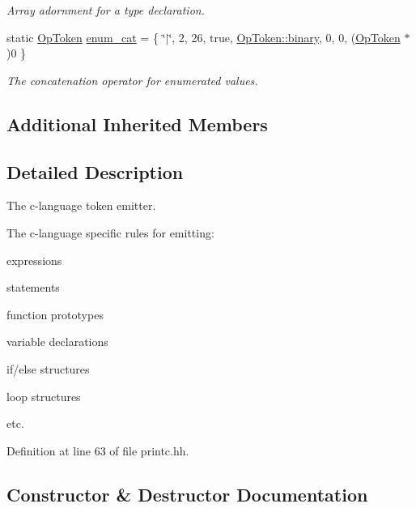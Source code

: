 \begin{DoxyCompactItemize}
\begin{DoxyCompactList}\small\item\em Array adornment for a type declaration. \end{DoxyCompactList}\item 
static \mbox{\hyperlink{class_op_token}{Op\+Token}} \mbox{\hyperlink{class_print_c_a5b018e8ef4c8150a9f9981efef4e3c80}{enum\+\_\+cat}} = \{ \char`\"{}$\vert$\char`\"{}, 2, 26, true, \mbox{\hyperlink{class_op_token_af41c7f108d5662ede7765c5a6c44eaffa3a2ec63522a9329a71ddbe8adc3e752d}{Op\+Token\+::binary}}, 0, 0, (\mbox{\hyperlink{class_op_token}{Op\+Token}} $\ast$)0 \}
\begin{DoxyCompactList}\small\item\em The {\itshape concatenation} operator for enumerated values. \end{DoxyCompactList}\end{DoxyCompactItemize}
\subsection*{Additional Inherited Members}


\subsection{Detailed Description}
The c-\/language token emitter. 

The c-\/language specific rules for emitting\+:
\begin{DoxyItemize}
\item expressions
\item statements
\item function prototypes
\item variable declarations
\item if/else structures
\item loop structures
\item etc. 
\end{DoxyItemize}

Definition at line 63 of file printc.\+hh.



\subsection{Constructor \& Destructor Documentation}
\mbox{\label{class_print_c_afd4f48f7193a4586ad4b6a01c8f60bc9}} 
